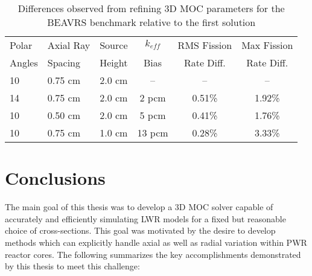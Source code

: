 \documentclass[12pt,twoside]{mitthesis-exec}
\begin{document}
\begin{table}[ht]
	\centering
	\caption{Differences observed from refining 3D MOC parameters for the BEAVRS benchmark relative to the first solution}
	\medskip
	\begin{tabular}{l|l|l|c|c|c}
		\hline
		Polar  & Axial Ray & Source & $k_{\textit{eff}}$  & RMS Fission & Max Fission \\
		Angles & Spacing   & Height & Bias                & Rate Diff. & Rate Diff. \\
		\hline
		10 & 0.75 cm & 2.0 cm & --     & --     & --  \\
		14 & 0.75 cm & 2.0 cm & 2 pcm  & 0.51\% & 1.92\%  \\
		10 & 0.50 cm & 2.0 cm & 5 pcm  & 0.41\% & 1.76\%  \\
		10 & 0.75 cm & 1.0 cm & 13 pcm & 0.28\% & 3.33\%  \\
		\hline
	\end{tabular}
	\label{tab:fc-param-sensitivity}
\end{table}


\clearpage

\section*{Conclusions}

The main goal of this thesis was to develop a 3D MOC solver capable of accurately and efficiently simulating LWR models for a fixed but reasonable choice of cross-sections. This goal was motivated by the desire to develop methods which can explicitly handle axial as well as radial variation within PWR reactor cores. The following summarizes the key accomplishments demonstrated by this thesis to meet this challenge:
\end{document}
